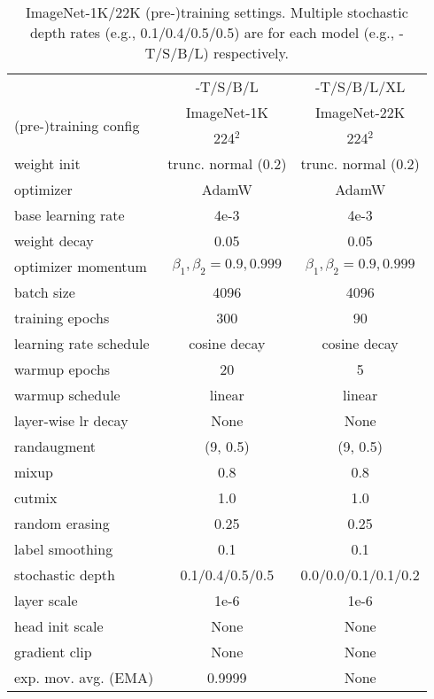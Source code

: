 \begin{table}[!htbp]
\small
\begin{tabular}{@{\hskip -0.05ex}l|c@{\hskip 1ex}c}
& \cnn{}-T/S/B/L & \cnn{}-T/S/B/L/XL \\
\multirow{2}{*}{(pre-)training config} & ImageNet-1K & ImageNet-22K \\
& 224$^2$ & 224$^2$ \\
\shline
weight init & trunc. normal (0.2) & trunc. normal (0.2) \\
optimizer & AdamW & AdamW\\
base learning rate & 4e-3 & 4e-3 \\
weight decay & 0.05 & 0.05 \\
optimizer momentum & $\beta_1, \beta_2{=}0.9, 0.999$ & $\beta_1, \beta_2{=}0.9, 0.999$ \\
batch size & 4096 & 4096 \\
training epochs & 300 & 90 \\
learning rate schedule & cosine decay & cosine decay \\
warmup epochs & 20 & 5 \\
warmup schedule & linear & linear \\
layer-wise lr decay \cite{Clark2020,Bao2021} & None & None \\
randaugment \cite{Cubuk2020} & (9, 0.5) & (9, 0.5) \\
mixup \cite{Zhang2018a} & 0.8 & 0.8 \\
cutmix \cite{Yun2019} & 1.0 & 1.0 \\
random erasing \cite{Zhong2020} & 0.25 & 0.25 \\
label smoothing \cite{Szegedy2016a} & 0.1 & 0.1 \\
stochastic depth \cite{Huang2016deep} & 0.1/0.4/0.5/0.5 & 0.0/0.0/0.1/0.1/0.2 \\
layer scale \cite{Touvron2021GoingDW} & 1e-6 & 1e-6 \\
head init scale \cite{Touvron2021GoingDW} & None & None \\
gradient clip & None & None \\
exp. mov. avg. (EMA) \cite{Polyak1992} & 0.9999 & None\\

\end{tabular}
\caption{ImageNet-1K/22K (pre-)training settings. Multiple stochastic depth rates (e.g., 0.1/0.4/0.5/0.5) are for each model (e.g., \cnn{}-T/S/B/L) respectively.}
\label{tab:train_detail}
\end{table}

